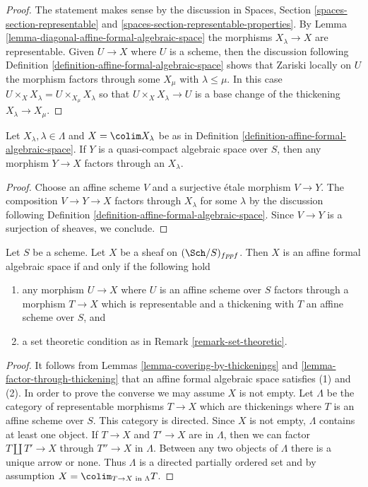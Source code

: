 \begin{proof}
The statement makes sense by the discussion in
Spaces, Section \ref{spaces-section-representable} and
\ref{spaces-section-representable-properties}.
By Lemma \ref{lemma-diagonal-affine-formal-algebraic-space}
the morphisms $X_\lambda \to X$ are representable.
Given $U \to X$ where $U$ is a scheme,
then the discussion following
Definition \ref{definition-affine-formal-algebraic-space}
shows that Zariski locally on $U$ the
morphism factors through some $X_\mu$ with $\lambda \leq \mu$.
In this case $U \times_X X_\lambda = U \times_{X_\mu} X_\lambda$
so that $U \times_X X_\lambda \to U$ is a base change of
the thickening $X_\lambda \to X_\mu$.
\end{proof}

\begin{lemma}
\label{lemma-factor-through-thickening}
Let $X_\lambda, \lambda \in \Lambda$ and $X = \colim X_\lambda$
be as in Definition \ref{definition-affine-formal-algebraic-space}.
If $Y$ is a quasi-compact algebraic space over $S$, then any
morphism $Y \to X$ factors through an $X_\lambda$.
\end{lemma}

\begin{proof}
Choose an affine scheme $V$ and a surjective \'etale morphism
$V \to Y$. The composition $V \to Y \to X$ factors through
$X_\lambda$ for some $\lambda$ by the discussion following
Definition \ref{definition-affine-formal-algebraic-space}.
Since $V \to Y$ is a surjection of sheaves, we conclude.
\end{proof}

\begin{lemma}
\label{lemma-characterize-affine-formal-algebraic-space}
Let $S$ be a scheme. Let $X$ be a sheaf on $(\Sch/S)_{fppf}$.
Then $X$ is an affine formal algebraic space if and only if
the following hold
\begin{enumerate}
\item any morphism $U \to X$ where $U$ is an affine scheme over $S$
factors through a morphism $T \to X$ which is representable and a
thickening with $T$ an affine scheme over $S$, and
\item a set theoretic condition as in Remark \ref{remark-set-theoretic}.
\end{enumerate}
\end{lemma}

\begin{proof}
It follows from Lemmas \ref{lemma-covering-by-thickenings} and
\ref{lemma-factor-through-thickening} that an affine formal algebraic space
satisfies (1) and (2). In order to prove the converse we may
assume $X$ is not empty.
Let $\Lambda$ be the category of representable morphisms $T \to X$ which are
thickenings where $T$ is an affine scheme over $S$. This category
is directed. Since $X$ is not empty, $\Lambda$ contains at least one
object. If $T \to X$ and $T' \to X$ are in $\Lambda$, then we can
factor $T \amalg T' \to X$ through $T'' \to X$ in $\Lambda$. Between
any two objects of $\Lambda$ there is a unique arrow or none. Thus
$\Lambda$ is a directed partially ordered set and by assumption
$X = \colim_{T \to X\text{ in }\Lambda} T$.
\end{proof}


